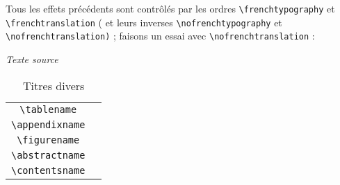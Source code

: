 \documentclass[a4paper,12pt,openright]{article}
\begin{document}
Tous les effets précédents sont contrôlés par les ordres 
\texttt{{\backslash}frenchtypography} 
et \texttt{{\backslash}frenchtrans\-lation} 
( et leurs inverses \texttt{{\backslash}nofrenchtypography}
et \texttt{{\backslash}nofrench\-translation)} ; 
faisons un essai avec \texttt{{\backslash}nofrenchtranslation} :
\begin{center} %
\begin{minipage}{\textwidth}
\begin{center} %
\textit{Texte source}\\
\begin{boxedverbatim}
{\nofrenchtranslation
 \begin{table}
 \caption{Titres divers}\medskip
  \begin{tabular}{|c|c|}
   \hline
    \verb|\tablename|    & \tablename \\
    \verb|\appendixname| & \appendixname \\
    \verb|\figurename|   & \figurename \\
    \verb|\abstractname| & \abstractname \\
    \verb|\contentsname| & \contentsname \\
    \hline
  \end{tabular}
 \end{table}
}
\end{boxedverbatim}
\end{center}
\end{minipage}
\\[.5em]
\setcounter{mpfootnote}{1} %
\renewcommand{\thempfootnote}{\arabic{mpfootnote}}


\end{center}
\end{document}
